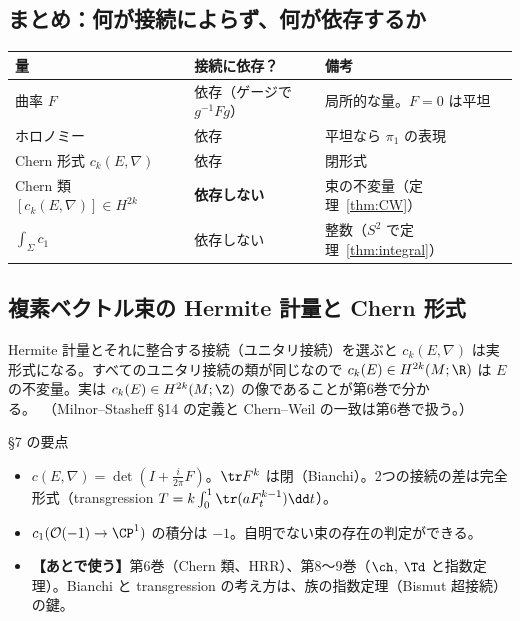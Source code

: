 \subsection{まとめ：何が接続によらず、何が依存するか}
\begin{center}
\begin{tabular}{lll}
\toprule
量 & 接続に依存？ & 備考\\
\midrule
曲率 $F$ & 依存（ゲージで $g^{-1}Fg$） & 局所的な量。$F=0$ は平坦\\
ホロノミー & 依存 & 平坦なら $\pi_1$ の表現\\
Chern 形式 $c_k(E,\nabla)$ & 依存 & 閉形式\\
Chern 類 $[c_k(E,\nabla)]\in H^{2k}$ & \textbf{依存しない} & 束の不変量（定理~\ref{thm:CW}）\\
$\int_{\Sigma}c_1$ & 依存しない & 整数（$S^2$ で定理~\ref{thm:integral}）\\
\bottomrule
\end{tabular}
\end{center}

\subsection{複素ベクトル束の Hermite 計量と Chern 形式}
Hermite 計量とそれに整合する接続（ユニタリ接続）を選ぶと $c_k(E,\nabla)$ は実形式になる。すべてのユニタリ接続の類が同じなので $c_k(E)\in H^{2k}(M;\R)$ は $E$ の不変量。実は $c_k(E)\in H^{2k}(M;\Z)$ の像であることが第6巻で分かる。\tC\ （Milnor--Stasheff §14 の定義と Chern--Weil の一致は第6巻で扱う。）

\begin{keybox}{§7 の要点}
\begin{itemize}
\item $c(E,\nabla)=\det(I+\frac i{2\pi}F)$。$\tr F^k$ は閉（Bianchi）。2つの接続の差は完全形式（transgression $T=k\int_0^1\tr(aF_t^{k-1})\dd t$）。
\item $c_1(\mathcal O(-1)\to\CP^1)$ の積分は $-1$。自明でない束の存在の判定ができる。
\item \textbf{【あとで使う】}第6巻（Chern 類、HRR）、第8〜9巻（$\ch$, $\Td$ と指数定理）。Bianchi と transgression の考え方は、族の指数定理（Bismut 超接続）の鍵。
\end{itemize}
\end{keybox}

